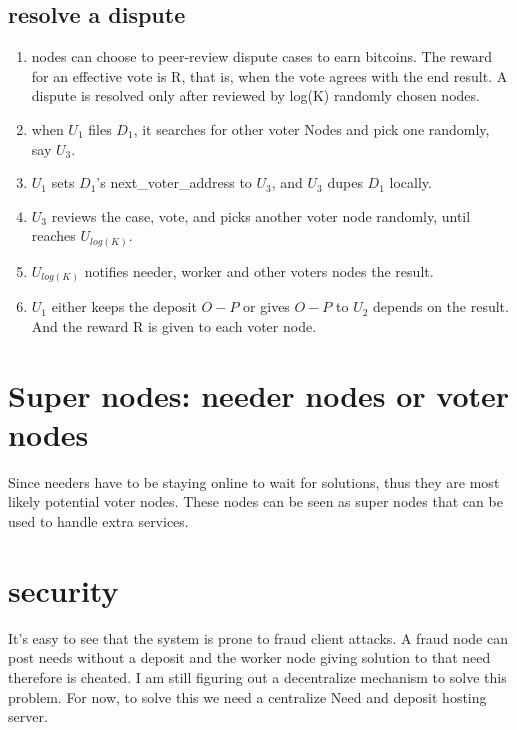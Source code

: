 \documentclass[12pt]{article}
\begin{document}
\subsection{resolve a dispute}
\begin{enumerate}
	\item nodes can choose to peer-review dispute cases to earn bitcoins. The reward for an effective vote is R, that is, when the vote agrees with the end result. A dispute is resolved only after reviewed by log(K) randomly chosen nodes.
	\item when $U_1$ files $D_1$, it searches for other voter Nodes and pick one randomly, say $U_3$. 
	\item $U_1$ sets $D_1$'s next\_voter\_address to $U_3$, and $U_3$ dupes $D_1$ locally. 
	\item $U_3$ reviews the case, vote, and picks another voter node randomly, until reaches $U_{log(K)}$.
	\item $U_{log(K)}$ notifies needer, worker and other voters nodes the result.
	\item $U_1$ either keeps the deposit $O-P$ or gives $O-P$ to $U_2$ depends on the result. And the reward R is given to each voter node.
\end{enumerate}

\section{Super nodes: needer nodes or voter nodes}
Since needers have to be staying online to wait for solutions, thus they are most likely potential voter nodes. These nodes can be seen as super nodes that can be used to handle extra services.

\section{security}
It's easy to see that the system is prone to fraud client attacks. A fraud node can post needs without a deposit and the worker node giving solution to that need therefore is cheated. I am still figuring out a decentralize mechanism to solve this problem. For now, to solve this we need a centralize Need and deposit hosting server.

\begin{thebibliography}{9}
\end{thebibliography}

	
\end{document}
